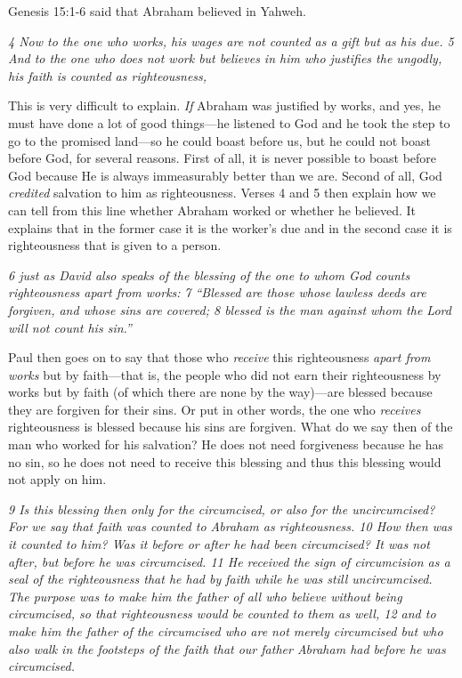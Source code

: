 Genesis 15:1-6 said that Abraham believed in Yahweh.

\emph{4 Now to the one who works, his wages are not counted as a gift
but as his due. 5 And to the one who does not work but believes in him
who justifies the ungodly, his faith is counted as righteousness,}

This is very difficult to explain. \emph{If} Abraham was justified by
works, and yes, he must have done a lot of good things---he listened to
God and he took the step to go to the promised land---so he could boast
before us, but he could not boast before God, for several reasons. First
of all, it is never possible to boast before God because He is always
immeasurably better than we are. Second of all, God \emph{credited}
salvation to him as righteousness. Verses 4 and 5 then explain how we
can tell from this line whether Abraham worked or whether he believed.
It explains that in the former case it is the worker's due and in the
second case it is righteousness that is given to a person.

\emph{6 just as David also speaks of the blessing of the one to whom God
counts righteousness apart from works:} \emph{7 ``Blessed are those
whose lawless deeds are forgiven,\emph{ }and whose sins are
covered;\emph{ }8 blessed is the man against whom the Lord will not
count his sin.''}

Paul then goes on to say that those who \emph{receive} this
righteousness \emph{apart from works} but by faith---that is, the people
who did not earn their righteousness by works but by faith (of which
there are none by the way)---are blessed because they are forgiven for
their sins. Or put in other words, the one who \emph{receives}
righteousness is blessed because his sins are forgiven. What do we say
then of the man who worked for his salvation? He does not need
forgiveness because he has no sin, so he does not need to receive this
blessing and thus this blessing would not apply on him.

\emph{9 Is this blessing then only for the circumcised, or also for the
uncircumcised? For we say that faith was counted to Abraham as
righteousness. 10 How then was it counted to him? Was it before or after
he had been circumcised? It was not after, but before he was
circumcised. 11 He received the sign of circumcision as a seal of the
righteousness that he had by faith while he was still uncircumcised. The
purpose was to make him the father of all who believe without being
circumcised, so that righteousness would be counted to them as well, 12
and to make him the father of the circumcised who are not merely
circumcised but who also walk in the footsteps of the faith that our
father Abraham had before he was circumcised.}

